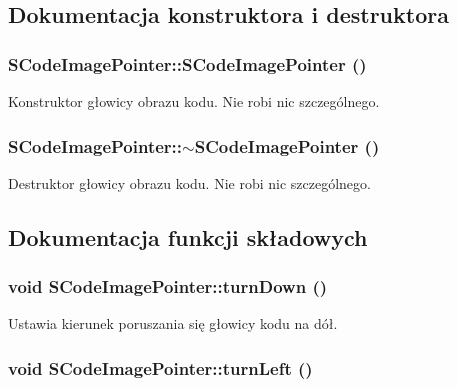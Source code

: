 \subsection{Dokumentacja konstruktora i destruktora}
\hypertarget{classSCodeImagePointer_bcef321f6fed2e37ca660978d86a3ecb}{
\subsubsection[{SCodeImagePointer}]{\setlength{\rightskip}{0pt plus 5cm}SCodeImagePointer::SCodeImagePointer ()}}
\label{classSCodeImagePointer_bcef321f6fed2e37ca660978d86a3ecb}


Konstruktor głowicy obrazu kodu. Nie robi nic szczególnego. \hypertarget{classSCodeImagePointer_65cc13e9ddfa6b12ff7ef24f658b5015}{
\subsubsection[{$\sim$SCodeImagePointer}]{\setlength{\rightskip}{0pt plus 5cm}SCodeImagePointer::$\sim$SCodeImagePointer ()}}
\label{classSCodeImagePointer_65cc13e9ddfa6b12ff7ef24f658b5015}


Destruktor głowicy obrazu kodu. Nie robi nic szczególnego. 

\subsection{Dokumentacja funkcji składowych}
\hypertarget{classSCodeImagePointer_fd353f45c3b71bfd402bbef5f9248752}{
\subsubsection[{turnDown}]{\setlength{\rightskip}{0pt plus 5cm}void SCodeImagePointer::turnDown ()}}
\label{classSCodeImagePointer_fd353f45c3b71bfd402bbef5f9248752}


Ustawia kierunek poruszania się głowicy kodu na dół. \hypertarget{classSCodeImagePointer_a3e17be0016265dfb389d64fe63c24ac}{
\subsubsection[{turnLeft}]{\setlength{\rightskip}{0pt plus 5cm}void SCodeImagePointer::turnLeft ()}}
\label{classSCodeImagePointer_a3e17be0016265dfb389d64fe63c24ac}


